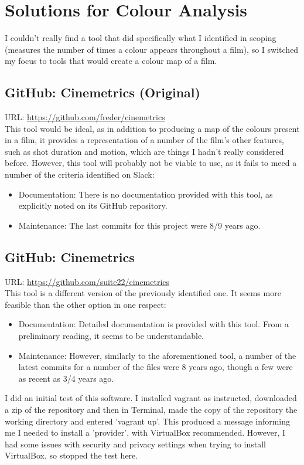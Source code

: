 \documentclass{article}
\begin{document}
\section*{Solutions for Colour Analysis}
I couldn't really find a tool that did specifically what I identified in scoping (measures the number of times a colour appears throughout a film), so I switched my focus to tools that would create a colour map of a film.

\subsection{GitHub: Cinemetrics (Original)}
URL: \url{https://github.com/freder/cinemetrics}\\
This tool would be ideal, as in addition to producing a map of the colours present in a film, it provides a representation of a number of the film's other features, such as shot duration and motion, which are things I hadn't really considered before. However, this tool will probably not be viable to use, as it fails to meed a number of the criteria identified on Slack: 
\begin{itemize}
    \item Documentation: There is no documentation provided with this tool, as explicitly noted on its GitHub repository.
    \item Maintenance: The last commits for this project were 8/9 years ago.
\end{itemize}

\subsection{GitHub: Cinemetrics}
URL: \url{https://github.com/suite22/cinemetrics}\\
This tool is a different version of the previously identified one. It seems more feasible than the other option in one respect:

\begin{itemize}
    \item Documentation: Detailed documentation is provided with this tool. From a preliminary reading, it seems to be understandable.
    \item Maintenance: However, similarly to the aforementioned tool, a number of the latest commits for a number of the files were 8 years ago, though a few were as recent as 3/4 years ago.
\end{itemize}
I did an initial test of this software. I installed vagrant as instructed, downloaded a zip of the repository and then in Terminal, made the copy of the repository the working directory and entered 'vagrant up'. This produced a message informing me I needed to install a 'provider', with VirtualBox recommended. However, I had some issues with security and privacy settings when trying to install VirtualBox, so stopped the test here.
\end{document}
